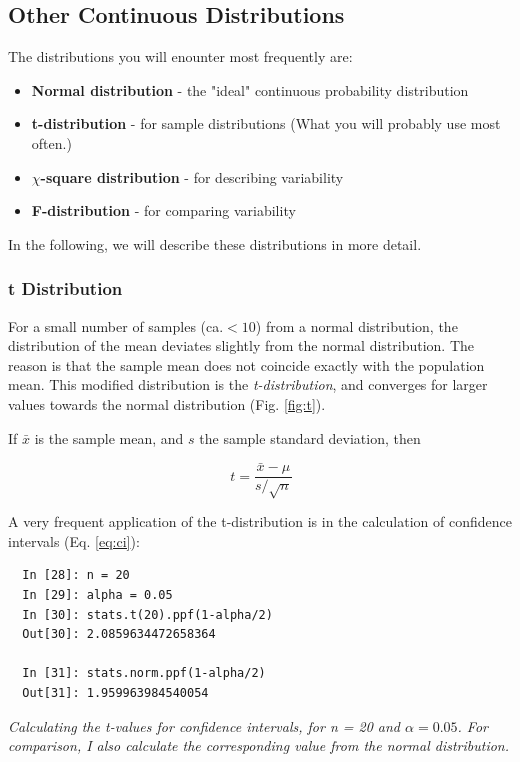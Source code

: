 \subsection{Other Continuous Distributions}\label{sec:ContinuousDistributions} 

The distributions you will enounter most frequently are:

\begin{itemize}
  \item \textbf{Normal distribution} - the "ideal" continuous probability distribution
  \item \textbf{t-distribution} - for sample distributions (What you will probably use most often.)
  \item \textbf{$\chi$-square distribution} - for describing  variability
  \item \textbf{F-distribution} - for comparing variability
\end{itemize}

In the following, we will describe these distributions in more detail.

\subsubsection{t Distribution}
For a small number of samples (ca.$<10$) from a normal distribution, the distribution of the mean deviates slightly from the normal distribution. The reason is that the sample mean does not coincide exactly with the population mean. This modified distribution is the \emph{t-distribution}, and converges for larger values towards the normal distribution (Fig. \ref{fig:t}).

If $\bar{x}$ is the sample mean, and $s$ the sample standard deviation, then

\begin{equation}\
  t = \frac{\bar{x}-\mu}{s/ \sqrt{n}}
\end{equation}

A very frequent application of the t-distribution is in the calculation of confidence intervals (Eq. \ref{eq:ci}):

\begin{lstlisting}
  In [28]: n = 20
  In [29]: alpha = 0.05
  In [30]: stats.t(20).ppf(1-alpha/2)
  Out[30]: 2.0859634472658364

  In [31]: stats.norm.ppf(1-alpha/2)
  Out[31]: 1.959963984540054
\end{lstlisting}
\emph{Calculating the t-values for confidence intervals, for n = 20 and $\alpha=0.05$. For comparison, I also calculate the corresponding value from the normal distribution.}

